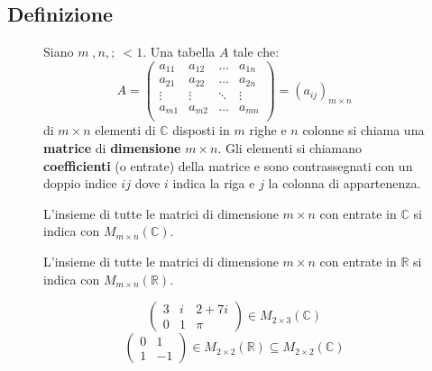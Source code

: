 \documentclass[a4paper]{article}
\theoremstyle{break}
\theoremstyle{break}
\theoremstyle{break}
\theoremstyle{break}
\begin{document}
\subsection{Definizione}
\begin{figure}[H]
  \begin{definition}
    Siano \( m\;,n,;\ < 1 \). Una tabella \( A \) tale che:
    \[
      A = \begin{pmatrix}
        a_{11} & a_{12} & \ldots & a_{1n} \\
        a_{21} & a_{22} & \ldots & a_{2n} \\
        \vdots & \vdots & \ddots & \vdots \\
        a_{m1} & a_{m2} & \ldots & a_{mn} \\
      \end{pmatrix}
      = (a_{ij})_{m \times n}
    \]
    di \( m \times n \) elementi di \( \mathbb{C} \) disposti in \( m \) righe e \( n \) colonne
    si chiama una \textbf{matrice} di \textbf{dimensione} \( m \times n \).
    Gli elementi si chiamano \textbf{coefficienti} (o entrate) della matrice e sono
    contrassegnati con un doppio indice \( ij \) dove \( i \) indica la riga e \( j \)
    la colonna di appartenenza.

    \vspace{0.5cm}
    L'insieme di tutte le matrici di dimensione \( m \times n \) con entrate in \( \mathbb{C} \)
    si indica con \( M_{m \times n}(\mathbb{C}) \).

    \vspace{0.5cm}
    L'insieme di tutte le matrici di dimensione \( m \times n \) con entrate in \( \mathbb{R} \)
    si indica con \( M_{m \times n}(\mathbb{R}) \).
  \end{definition}
\end{figure}

\begin{figure}[H]
  \begin{example}
    \[
      \begin{pmatrix} 3 & i & 2+7i \\
        0 & 1 & \pi
      \end{pmatrix} \in M_{2 \times 3}(\mathbb{C})
      \]
      \[
        \begin{pmatrix}
          0 & 1  \\
          1 & -1
        \end{pmatrix} \in M_{2 \times 2}(\mathbb{R}) \subseteq M_{2 \times 2}(\mathbb{C})
      \]
    \end{example}
  \end{figure}
\end{document}
